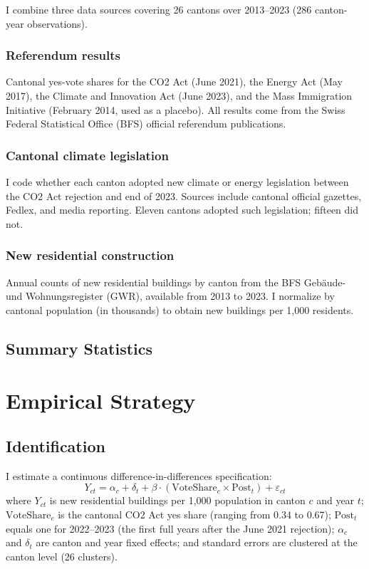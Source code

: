\documentclass[12pt]{article}
\begin{document}
I combine three data sources covering 26 cantons over 2013--2023 (286 canton-year observations).

\subsubsection*{Referendum results} Cantonal yes-vote shares for the CO2 Act (June 2021), the Energy Act (May 2017), the Climate and Innovation Act (June 2023), and the Mass Immigration Initiative (February 2014, used as a placebo). All results come from the Swiss Federal Statistical Office (BFS) official referendum publications.

\subsubsection*{Cantonal climate legislation} I code whether each canton adopted new climate or energy legislation between the CO2 Act rejection and end of 2023. Sources include cantonal official gazettes, Fedlex, and media reporting. Eleven cantons adopted such legislation; fifteen did not.

\subsubsection*{New residential construction} Annual counts of new residential buildings by canton from the BFS Geb\"aude- und Wohnungsregister (GWR), available from 2013 to 2023. I normalize by cantonal population (in thousands) to obtain new buildings per 1,000 residents.

\subsection{Summary Statistics}




\section{Empirical Strategy}
\label{sec:strategy}

\subsection{Identification}

I estimate a continuous difference-in-differences specification:
\begin{equation}
Y_{ct} = \alpha_c + \delta_t + \beta \cdot (\text{VoteShare}_c \times \text{Post}_t) + \varepsilon_{ct}
\label{eq:main}
\end{equation}
where $Y_{ct}$ is new residential buildings per 1,000 population in canton $c$ and year $t$; $\text{VoteShare}_c$ is the cantonal CO2 Act yes share (ranging from 0.34 to 0.67); $\text{Post}_t$ equals one for 2022--2023 (the first full years after the June 2021 rejection); $\alpha_c$ and $\delta_t$ are canton and year fixed effects; and standard errors are clustered at the canton level (26 clusters).
\end{document}
